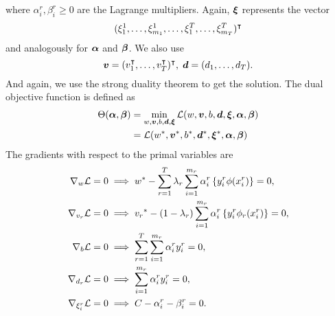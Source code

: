 where $\alpha_i^r, \beta_i^r \geq 0$ are the Lagrange multipliers. Again, $\bm{\xi}$ represents the vector $$(\xi_1^1, \ldots, \xi_{m_1}^1, \ldots, \xi_1^T, \ldots, \xi_{m_T}^T)^\intercal$$ and analogously for $\bm{\alpha}$ and $\bm{\beta}$.
We also use 
$$ \bm{v} = (v_1^\intercal, \ldots, v_T^\intercal)^\intercal,\; \bm{d} = (d_1, \ldots, d_T).$$
And again, we use the strong duality theorem  to get the solution.
The dual objective function is defined as 
\begin{equation}\nonumber
    \begin{aligned}
         \Theta(\bm{\alpha}, \bm{\beta}) &=  \min_{{w}, \bm{v}, b, \bm{d}, \bm{\xi}} \mathcal{L}({w}, \bm{v}, b, \bm{d}, \bm{\xi}, \bm{\alpha}, \bm{\beta}) \\
         &= \mathcal{L}({{w}}^*, {\bm{v}}^*, {b}^*, {\bm{d}}^*, {\bm{\xi}}^*, \bm{\alpha}, \bm{\beta})
    \end{aligned}    
\end{equation}
The gradients with respect to the primal variables are
\begin{align}
    \grad_{{w}} \lagr  = 0  &\implies \optim{{w}} - \sum_{r= 1}^\ntasks \lambda_r \sum_{i=1}^{m_r} {\alpha_i^r} \left\lbrace y_i^r \phi(x_i^r) \right\rbrace = 0 , \label{eq:common_repr_conv} \\
    \grad_{{v}_r} \lagr  = 0 &\implies \optim{{v}_r} - (1 - \lambda_r) \sum_{i=1}^{m_r} {\alpha_i^r} \left\lbrace y_i^r \phi_r(x_i^r) \right\rbrace = 0 , \label{eq:specific_repr_conv} \\
    \grad_{b} \lagr  = 0  &\implies \sum_{r= 1}^T \sum_{i=1}^{m_r} {\alpha_i^r} y_i^r = 0 , \label{eq:specific_eqconstr_conv}  \\
    \grad_{{d}_r} \lagr  = 0 &\implies \sum_{i=1}^{m_r} {\alpha_i^r} y_i^r = 0 , \label{eq:common_eqconstr_conv} \\
    \grad_{\xi_i^r} \lagr  = 0 &\implies C - {\alpha_i^r} - {\beta_i^r} = 0 . \label{eq:xi_feas_conv}
\end{align}
